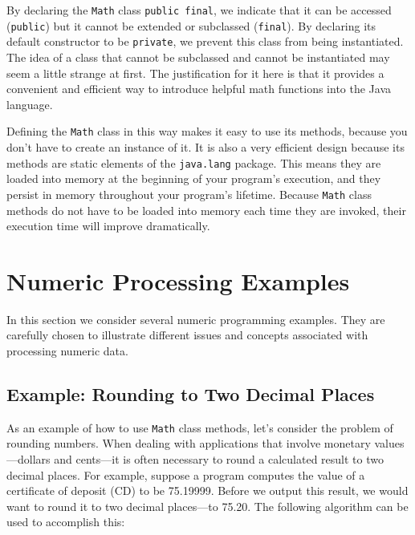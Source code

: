 \noindent By declaring the {\tt Math} class {\tt public final},
we indicate that it can be accessed ({\tt public}) but it cannot be
extended or subclassed ({\tt final}). By declaring its default
constructor to be {\tt private}, we prevent this class from being
instantiated.  The idea of a class that cannot be subclassed and
cannot be instantiated may seem a little strange at first. The
justification for it here is that it provides a convenient and
efficient way to introduce helpful math functions into the Java
language.


Defining the {\tt Math} class in this way makes it easy to use its
methods, because you don't have to create an instance of it. It is
also a very efficient design because its methods are static elements
of the {\tt java.lang} package.  This means they are loaded into memory
at the beginning of your program's execution, and they persist in
memory throughout your program's lifetime.  Because {\tt Math} class
methods do not have to be loaded into memory each time they are
invoked, their execution time will improve dramatically.


\section{Numeric Processing Examples}
\label{numeric-processing-examples}

In this section we consider several numeric programming examples.
They are carefully chosen to illustrate different issues and concepts
associated with processing numeric data. 

\subsection{Example: Rounding to Two Decimal Places}
\noindent As an example of how to use {\tt Math} class methods,
let's consider the problem of rounding numbers. When dealing with
applications that involve monetary values---dollars and cents---it is
often necessary to round a calculated result to two decimal
places. For example, suppose a program computes the value of a
certificate of deposit (CD) to be 75.19999. Before we output this
result, we would want to round it to two decimal places---to 75.20.
The following algorithm can be used to accomplish this:

